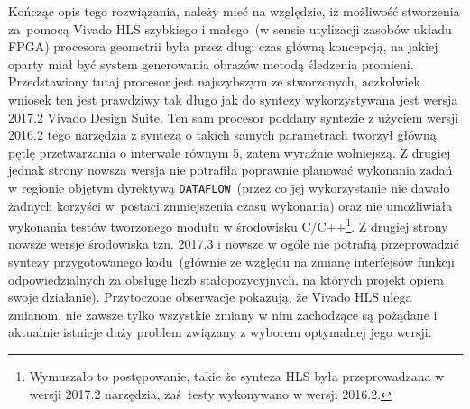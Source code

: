 Kończąc opis tego rozwiązania, należy mieć na względzie, iż możliwość stworzenia za~pomocą Vivado HLS szybkiego i małego~(w sensie utylizacji zasobów układu FPGA) procesora geometrii była przez długi czas główną koncepcją, na jakiej oparty miał być system generowania obrazów metodą śledzenia promieni. Przedstawiony tutaj procesor jest najszybszym ze stworzonych, aczkolwiek wniosek ten jest prawdziwy tak długo jak do syntezy wykorzystywana jest wersja 2017.2 Vivado Design Suite. Ten sam procesor poddany syntezie z użyciem wersji 2016.2 tego narzędzia z syntezą o takich samych parametrach tworzył główną pętlę przetwarzania o interwale  równym 5, zatem wyraźnie wolniejszą. Z drugiej jednak strony nowsza wersja nie potrafiła poprawnie planować wykonania zadań w regionie objętym dyrektywą \texttt{DATAFLOW}~(przez co jej wykorzystanie nie dawało żadnych korzyści w~postaci zmniejszenia czasu wykonania) oraz nie umożliwiała wykonania testów tworzonego modułu w środowisku C/C++\footnote{Wymuszało to postępowanie, takie że synteza HLS była przeprowadzana w wersji 2017.2 narzędzia, zaś~testy wykonywano w wersji 2016.2.}. Z drugiej strony nowsze wersje środowiska tzn. 2017.3 i nowsze w ogóle nie potrafią przeprowadzić syntezy przygotowanego kodu~(głównie ze względu na zmianę interfejsów funkcji odpowiedzialnych za obsługę liczb stałopozycyjnych, na których projekt opiera swoje działanie). Przytoczone obserwacje pokazują, że Vivado HLS ulega zmianom, nie zawsze tylko wszystkie zmiany w nim zachodzące są pożądane i aktualnie istnieje duży problem związany z wyborem optymalnej jego wersji.


